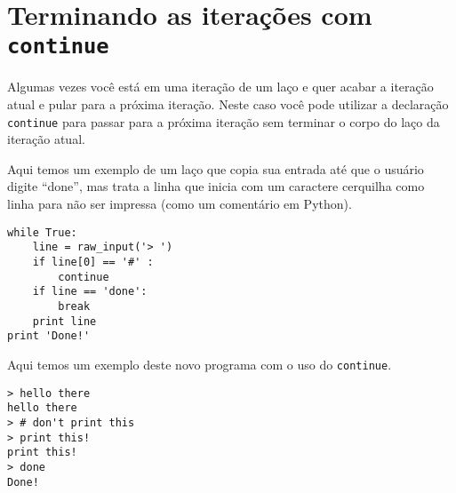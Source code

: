 
\section{Terminando as iterações com {\tt continue}}


Algumas vezes você está em uma iteração de um laço e quer acabar a iteração
atual e pular para a próxima iteração. Neste caso você pode utilizar a
declaração {\tt continue} para passar para a próxima iteração sem terminar o
corpo do laço da iteração atual.


Aqui temos um exemplo de um laço que copia sua entrada até que o usuário
digite ``done'', mas trata a linha que inicia com um caractere cerquilha 
como linha para não ser impressa (como um comentário em Python).

\beforeverb
\begin{verbatim}
while True:
    line = raw_input('> ')
    if line[0] == '#' :
        continue
    if line == 'done':
        break
    print line
print 'Done!'
\end{verbatim}
\afterverb
%
%
Aqui temos um exemplo deste novo programa com o uso do {\tt continue}.

\beforeverb
\begin{verbatim}
> hello there
hello there
> # don't print this
> print this!
print this!
> done
Done!
\end{verbatim}
\afterverb
%

